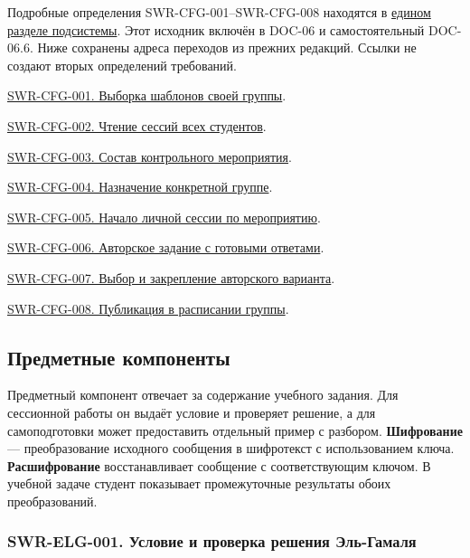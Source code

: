 \documentclass[12pt,a4paper]{article}
\begin{document}
\hypertarget{шаблоны-набора-задач-контрольные-мероприятия-и-модерация}{}

Подробные определения SWR-CFG-001--SWR-CFG-008 находятся в {\hyperlink{конфигурации-контрольные-мероприятия-и-модерация}{едином разделе подсистемы}}. Этот исходник включён в DOC-06 и самостоятельный DOC-06.6. Ниже сохранены адреса переходов из прежних редакций. Ссылки не создают вторых определений требований.

{\hyperlink{swr-cfg-001}{SWR-CFG-001. Выборка шаблонов своей группы}}.

{\hyperlink{swr-cfg-002}{SWR-CFG-002. Чтение сессий всех студентов}}.

{\hyperlink{swr-cfg-003}{SWR-CFG-003. Состав контрольного мероприятия}}.

{\hyperlink{swr-cfg-004}{SWR-CFG-004. Назначение конкретной группе}}.

{\hyperlink{swr-cfg-005}{SWR-CFG-005. Начало личной сессии по мероприятию}}.

{\hyperlink{swr-cfg-006}{SWR-CFG-006. Авторское задание с готовыми ответами}}.

{\hyperlink{swr-cfg-007}{SWR-CFG-007. Выбор и закрепление авторского варианта}}.

{\hyperlink{swr-cfg-008}{SWR-CFG-008. Публикация в расписании группы}}.

\subsection{Предметные компоненты}\label{ux43fux440ux435ux434ux43cux435ux442ux43dux44bux435-ux43aux43eux43cux43fux43eux43dux435ux43dux442ux44b}

\hypertarget{предметные-компоненты}{}

Предметный компонент отвечает за содержание учебного задания. Для сессионной работы он выдаёт условие и проверяет решение, а для самоподготовки может предоставить отдельный пример с разбором. \textbf{Шифрование} --- преобразование исходного сообщения в шифротекст с использованием ключа. \textbf{Расшифрование} восстанавливает сообщение с соответствующим ключом. В учебной задаче студент показывает промежуточные результаты обоих преобразований.

\subsubsection{SWR-ELG-001. Условие и проверка решения Эль-Гамаля}\label{swr-elg-001-ux443ux441ux43bux43eux432ux438ux435-ux438-ux43fux440ux43eux432ux435ux440ux43aux430-ux440ux435ux448ux435ux43dux438ux44f-ux44dux43bux44c-ux433ux430ux43cux430ux43bux44f}
\end{document}
